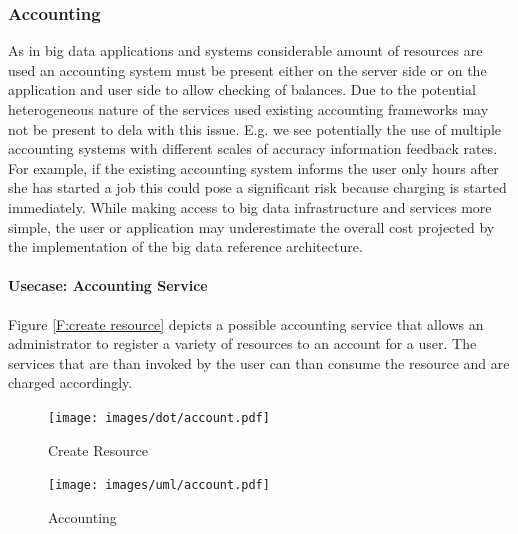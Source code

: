 \documentclass[10pt]{article}
\begin{document}



 
\subsubsection{Accounting}


As in big data applications and systems considerable amount of
resources are used an accounting system must be present either on the
server side or on the application and user side to allow checking of
balances. Due to the potential heterogeneous nature of the services
used existing accounting frameworks may not be present to dela with
this issue. E.g. we see potentially the use of multiple accounting
systems with different scales of accuracy information feedback
rates. For example, if the existing accounting system informs the user
only hours after she has started a job this could pose a significant
risk because charging is started immediately. While making access to
big data infrastructure and services more simple, the user or
application may underestimate the overall cost projected by the
implementation of the big data reference architecture.



\paragraph{Usecase: Accounting Service}

Figure \ref{F:create resource} depicts a possible accounting service
that allows an administrator to register a variety of resources to an
account for a user. The services that are than invoked by the user can
than consume the resource and are charged accordingly.

\begin{figure}[!h]
\texttt{[image: images/dot/account.pdf]}
\caption{Create Resource}\label{F:createresource}
\end{figure}

\begin{figure}[!h]
\centering
\texttt{[image: images/uml/account.pdf]}
\caption{Accounting}\label{F:uml-accounting}
\end{figure}
\end{document}
